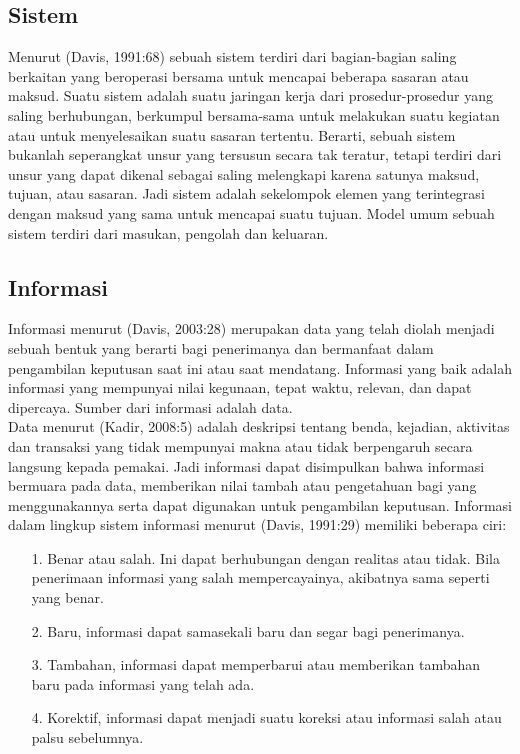 \documentclass{jtetiproposalskripsi}
\begin{document}
\subsection{Sistem}
Menurut  (Davis, 1991:68) sebuah sistem terdiri dari bagian-bagian saling berkaitan yang beroperasi bersama untuk mencapai beberapa sasaran atau maksud. Suatu sistem adalah suatu jaringan kerja dari prosedur-prosedur yang saling berhubungan, berkumpul bersama-sama untuk melakukan suatu kegiatan atau untuk menyelesaikan suatu sasaran tertentu. Berarti, sebuah sistem bukanlah seperangkat unsur yang tersusun secara tak teratur, tetapi terdiri dari unsur yang dapat dikenal sebagai saling melengkapi karena satunya maksud, tujuan, atau sasaran. Jadi sistem adalah sekelompok elemen yang terintegrasi dengan maksud yang sama untuk mencapai suatu tujuan. Model umum sebuah sistem terdiri dari masukan, pengolah dan keluaran.

\subsection{Informasi}
Informasi menurut (Davis, 2003:28) merupakan data yang telah diolah menjadi sebuah bentuk yang berarti bagi penerimanya dan bermanfaat dalam pengambilan keputusan saat ini atau saat mendatang. Informasi yang baik adalah informasi yang mempunyai nilai kegunaan, tepat waktu, relevan, dan dapat dipercaya. Sumber dari informasi adalah data.
\\
Data menurut (Kadir, 2008:5) adalah deskripsi tentang benda, kejadian, aktivitas dan transaksi yang tidak mempunyai makna atau tidak berpengaruh secara langsung kepada pemakai. Jadi informasi dapat disimpulkan bahwa informasi bermuara pada data, memberikan nilai tambah atau pengetahuan bagi yang menggunakannya serta dapat digunakan untuk pengambilan keputusan. Informasi dalam lingkup sistem informasi menurut (Davis, 1991:29) memiliki beberapa ciri:
\begin{itemize}
\item[1.]Benar atau salah. Ini dapat berhubungan dengan realitas atau tidak. Bila penerimaan informasi yang salah mempercayainya, akibatnya sama seperti yang benar.
\item[2.]Baru, informasi dapat samasekali baru dan segar bagi penerimanya.
\item[3.]Tambahan, informasi dapat memperbarui atau memberikan tambahan baru pada informasi yang telah ada.
\item[4.]Korektif, informasi dapat menjadi suatu koreksi atau informasi salah atau palsu sebelumnya.
\end{itemize}
\end{document}

